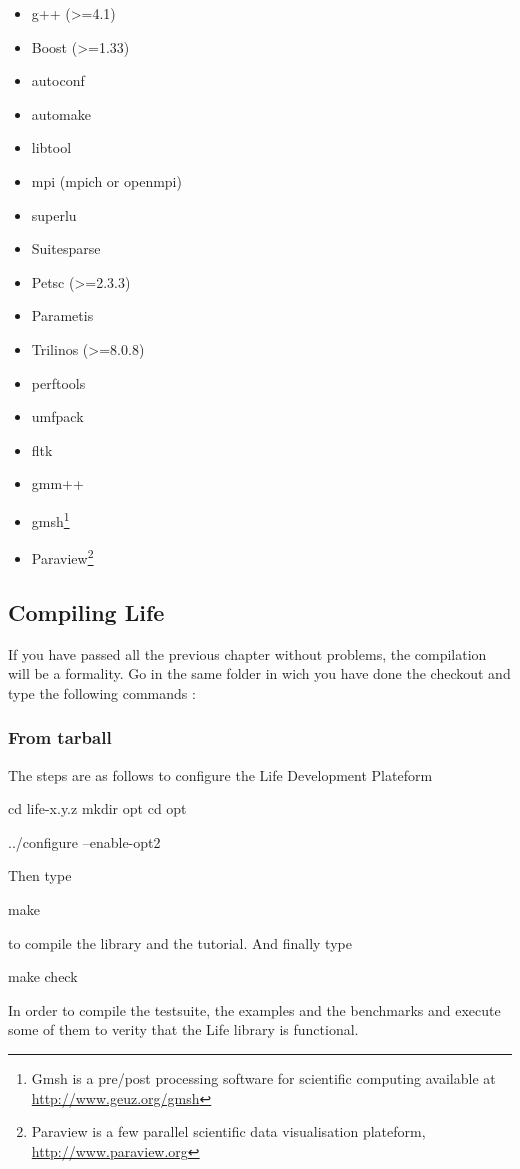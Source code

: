 \documentclass[a4paper]{book}
\begin{document}
\begin{itemize}
\item g++ (>=4.1)
\item Boost (>=1.33)
\item autoconf
\item automake
\item libtool
\item mpi (mpich or openmpi)
\item superlu
\item Suitesparse
\item Petsc (>=2.3.3)
\item Parametis
\item Trilinos (>=8.0.8)
\item perftools
\item umfpack
\item fltk
\item gmm++
\item gmsh\footnote{Gmsh is a pre/post processing software for scientific
computing available at \url{http://www.geuz.org/gmsh}}
\item Paraview\footnote{Paraview is a few parallel scientific data visualisation
plateform, \url{http://www.paraview.org}}
\end{itemize}

\subsection{Compiling Life}

If you have passed all the previous chapter without problems, the
compilation will be a formality.  Go in the same folder in wich you
have done the checkout and type the following commands :

\subsubsection{From tarball}
\label{sec:from-tarball}

The steps are as follows to configure the Life Development Plateform

\begin{unixcom}
  cd life-x.y.z
  mkdir opt
  cd opt

  ../configure --enable-opt2
\end{unixcom}

Then type
\begin{unixcom}
  make
\end{unixcom}

to compile the library and the tutorial. And finally type
\begin{unixcom}
  make check
\end{unixcom}
In order to compile the testsuite, the examples and the benchmarks and
execute some of them to verity that the Life library is functional.
\end{document}
